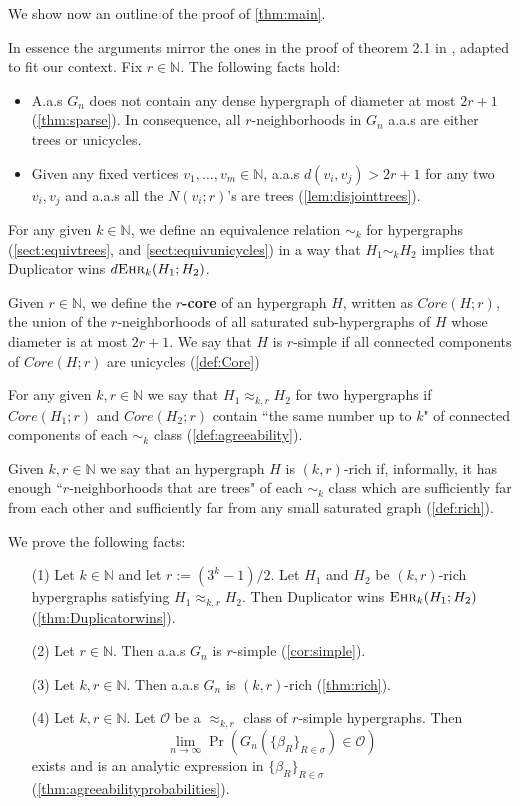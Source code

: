 \documentclass[12pt,notitlepage,a4paper]{article}
\theoremstyle{definition}
\newcommand{\N}{\mathbb{N}}
\newcommand{\Ln}{\lim\limits_{n\to \infty}}
\newcommand{\ehr}{\textsc{Ehr}}
\begin{document}
We show now an outline of the proof of \cref{thm:main}. \par 
In essence the arguments mirror the ones in the proof of theorem 2.1
in \cite{lynch1992probabilities}, adapted to fit our context. Fix $r\in \N$.
The following facts hold:
\begin{itemize}
	\item A.a.s $G_n$ does not contain any dense hypergraph of diameter at most 
	$2r+1$ (\cref{thm:sparse}). In consequence, all $r$-neighborhoods in $G_n$
	a.a.s are either trees or unicycles.
	\item Given any fixed vertices $v_1,\dots, v_m\in\N$, a.a.s 
	$d(v_i,v_j)>2r+1$ for any two $v_i,v_j$ and a.a.s all the $N(v_i;r)$'s 
	are trees (\cref{lem:disjointtrees}).
\end{itemize} 
For any given $k\in \N$, we define an equivalence relation $\sim_k$ for 
hypergraphs (\cref{sect:equivtrees}, and \cref{sect:equivunicycles})
in a way that $H_1\sim_k H_2$ implies that Duplicator wins $d\ehr_{k}(H_1;H_2)$.\par
Given $r\in \N$, we define the \textbf{$r$-core} of an hypergraph $H$, 
written as $Core(H;r)$, the union of the $r$-neighborhoods of
all saturated sub-hypergraphs of $H$ whose diameter is at most $2r+1$.
We say that $H$ is $r$-simple if all connected components of
$Core(H;r)$ are unicycles (\cref{def:Core}) \par
For any given $k,r\in \N$ we say that $H_1\approx_{k,r} H_2$ for two
hypergraphs if $Core(H_1;r)$ and $Core(H_2;r)$ contain ``the same number
up to $k$" of connected components of each $\sim_k$ class (\cref{def:agreeability}).\par
Given $k,r\in \N$ we say that an hypergraph $H$ is $(k,r)$-rich if, informally, 
it has enough ``$r$-neighborhoods that are trees" of each $\sim_k$ class which
are sufficiently far from each other and sufficiently far from any small saturated
graph (\cref{def:rich}). \par
We prove the following facts:
\begin{itemize}
	\item[(1)] Let $k\in \N$ and let $r:=(3^k-1)/2$. Let $H_1$ and $H_2$
	be $(k,r)$-rich hypergraphs satisfying $H_1\approx_{k,r} H_2$. Then
	Duplicator wins $\ehr_{k}(H_1; H_2)$ (\cref{thm:Duplicatorwins}).
	\item[(2)] Let $r\in \N$. Then a.a.s $G_n$ is $r$-simple (\cref{cor:simple}).
	\item[(3)] Let $k,r\in \N$. Then a.a.s $G_n$ is $(k,r)$-rich (\cref{thm:rich}).
	\item[(4)] Let $k,r \in \N$. Let $\mathcal{O}$ be a $\approx_{k,r}$ class
	of $r$-simple hypergraphs. Then 
	\[
	\Ln \Pr\left(G_n\left(\{\beta_R\}_{R\in \sigma}\right)\in \mathcal{O}\right)
	\]
	exists
	and is an analytic expression in $\{\beta_R\}_{R\in \sigma}$ 
	(\cref{thm:agreeabilityprobabilities}).
\end{itemize}
\end{document}

